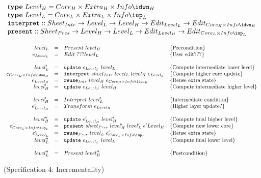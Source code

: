 \begin{small}\( \begin{array}{lcl}  \label{inv:incrementality}
\text{\bf type}~Level_{H}  =  Core_{H} \times Extra_{H} \times Info\idwn_{H}\\
\text{\bf type}~Level_{L}  =  Core_{L} \times Extra_{L} \times Info\iup_{L}\\
{\tt interpret}  ::  Sheet_{Intr} \rightarrow Level_{L} \rightarrow Level_{H} \rightarrow  Edit_{Level_{L}} \rightarrow Edit_{Core_{H}\times Info\idwn_{H}} \\
{\tt present}  ::  Sheet_{Pres} \rightarrow Level_{H} \rightarrow Level_{L}  \rightarrow Edit_{Level_{H}} \rightarrow Edit_{Core_{L}\times Info\iup_{L}}\\
\\
\end{array}\) \\
\( \begin{array}{rcll}  
level_{L} 	& = & Present~level_{H}						& \text{\{Precondition\}}\\
e_{Level_{L}}& = & Edit~???level_{L}							& \text{\{User edit???\}}\\
\\
level'_{L} 	& = & {\tt update}~e_{Level_{L}}~level_{L}                 & \text{\{Compute intermediate lower level\}}\\
e_{Core_{H} \times Info\idwn_{H}}  & = & {\tt interpret}~sheet_{Intr}~level_{L}~level_{H}~e_{Level_{L}} & \text{\{Compute higher core update\}}\\
e_{Level_{H}} & = & {\tt reuse}_{Intr}~level_{H}~e_{Core_{H}\times Info\idwn_{H}}     & \text{\{Reuse extra state\}}\\
level'_{H} & = & {\tt update}~e_{Level_{H}}~level_{H}                 & \text{\{Compute intermediate higher level\}}\\
\\
level'_{H} & = & Interpret~level'_{L}						& \text{\{Intermediate condition\}}\\
e'_{Level_{H}} & = & Transform~e_{Level_{H}} 			& \text{\{Higher layer update?\}}\\
\\
level''_{H} & = & {\tt update}~e'_{Level_{H}}~level'_{H}                 & \text{\{Compute final higher level\}}\\
e'_{Core_{L}\times Info\iup_{L}}  & = & {\tt present}~sheet_{Pres}~level'_{H}~level'_{L}~e'{Level_{H}} & \text{\{Compute new lower core\}}\\
e'_{Level_{L}} & = & {\tt reuse}_{Pres}~level_{L}~e'_{Core_{L}\times Info\iup_{L}} & \text{\{Reuse extra state\}}\\
level''_{L} & = & {\tt update}~e_{Level_{L}}~level_{L}                 & \text{\{Compute final lower level\}}\\
\\
level''_{L} & = & Present~level''_{H}						& \text{\{Postcondition\}}\\
\end{array}\)
\end{small}
\begin{center}(Specification 4: Incrementality)\end{center}\vspace{1em}

